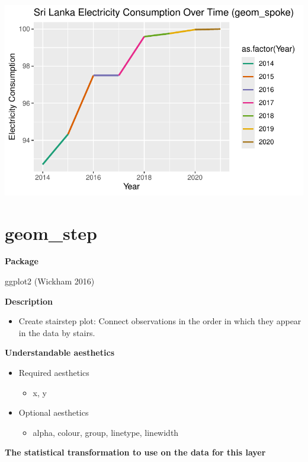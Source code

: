 \documentclass[
  letterpaper,
  DIV=11,
  numbers=noendperiod]{scrreprt}
\providecommand{\tightlist}{%
  \setlength{\itemsep}{0pt}\setlength{\parskip}{0pt}}\usepackage{longtable,booktabs,array}
\begin{document}
\includegraphics{s_files/figure-pdf/unnamed-chunk-7-1.pdf}

\section{geom\_step}\label{geom_step}

\textbf{Package}

ggplot2 (Wickham 2016)

\textbf{Description}

\begin{itemize}
\tightlist
\item
  Create stairstep plot: Connect observations in the order in which they
  appear in the data by stairs.
\end{itemize}

\textbf{Understandable aesthetics}

\begin{itemize}
\tightlist
\item
  Required aesthetics

  \begin{itemize}
  \tightlist
  \item
    x, y
  \end{itemize}
\item
  Optional aesthetics

  \begin{itemize}
  \tightlist
  \item
    alpha, colour, group, linetype, linewidth
  \end{itemize}
\end{itemize}

\textbf{The statistical transformation to use on the data for this
layer}
\end{document}
